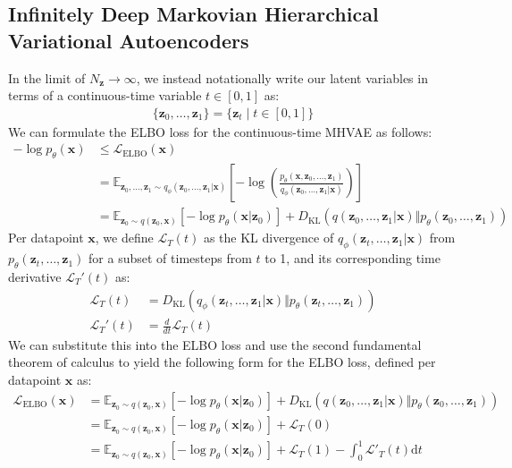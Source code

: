 \documentclass[ oneside,%
                    author={George Herbert},
                    degree={MSci},
                     title={Video Diffusion Models for Climate Simulations},
                  subtitle={}]{dissertation}
\begin{document}
\subsection{Infinitely Deep Markovian Hierarchical Variational Autoencoders}
\label{sec:background_vae_infinite}

In the limit of $N_\mathbf{z}\to\infty$, we instead notationally write our latent variables in terms of a continuous-time variable $t\in[0,1]$ as:
\begin{align}
      \{\mathbf{z}_0,\ldots,\mathbf{z}_1\}=\{\mathbf{z}_t\mid t\in[0,1]\}
\end{align}
We can formulate the ELBO loss for the continuous-time MHVAE as follows:
\begin{align}
      -\log p_\theta(\mathbf{x})&\le \mathcal{L}_{\mathrm{ELBO}}(\mathbf{x})\\
      &=\mathbb{E}_{\mathbf{z}_0,\ldots,\mathbf{z}_1\sim q_\phi(\mathbf{z}_0,\ldots,\mathbf{z}_1|\mathbf{x})}\left[-\log\left(\frac{p_\theta(\mathbf{x},\mathbf{z}_0,\ldots,\mathbf{z}_1)}{q_\phi(\mathbf{z}_0,\ldots,\mathbf{z}_1|\mathbf{x})}\right) \right]\\
      &=\mathbb{E}_{\mathbf{z}_0\sim q(\mathbf{z}_0,\mathbf{x})}\left[-\log p_\theta(\mathbf{x}|\mathbf{z}_0)\right]+D_{\mathrm{KL}}(q(\mathbf{z}_0,\ldots,\mathbf{z}_1|\mathbf{x})\Vert p_\theta (\mathbf{z}_0,\ldots,\mathbf{z}_1))
\end{align}
Per datapoint $\mathbf{x}$, we define $\mathcal{L}_T(t)$ as the KL divergence of $q_\phi(\mathbf{z}_t,\ldots,\mathbf{z}_1|\mathbf{x})$ from $p_\theta(\mathbf{z}_t,\ldots,\mathbf{z}_1)$ for a subset of timesteps from $t$ to 1, and its corresponding time derivative $\mathcal{L}_T'(t)$ as:
\begin{align}
      \mathcal{L}_T(t)&=D_{\mathrm{KL}}(q_\phi(\mathbf{z}_t,\ldots,\mathbf{z}_1|\mathbf{x})\Vert p_\theta(\mathbf{z}_t,\ldots,\mathbf{z}_1))\label{eq:dkl_t}\\
      \mathcal{L}_T'(t)&=\frac{d}{dt}\mathcal{L}_T(t)
\end{align}
We can substitute this into the ELBO loss and use the second fundamental theorem of calculus to yield the following form for the ELBO loss, defined per datapoint $\mathbf{x}$ as:
\begin{align}
      \mathcal{L}_{\mathrm{ELBO}}(\mathbf{x})&=\mathbb{E}_{\mathbf{z}_0\sim q(\mathbf{z}_0,\mathbf{x})}\left[-\log p_\theta(\mathbf{x}|\mathbf{z}_0)\right]+D_{\mathrm{KL}}(q(\mathbf{z}_0,\ldots,\mathbf{z}_1|\mathbf{x})\Vert p_\theta (\mathbf{z}_0,\ldots,\mathbf{z}_1))\\
      &=\mathbb{E}_{\mathbf{z}_0\sim q(\mathbf{z}_0,\mathbf{x})}\left[-\log p_\theta(\mathbf{x}|\mathbf{z}_0)\right]+\mathcal{L}_T(0)\\
      &=\mathbb{E}_{\mathbf{z}_0\sim q(\mathbf{z}_0,\mathbf{x})}\left[-\log p_\theta(\mathbf{x}|\mathbf{z}_0)\right]+\mathcal{L}_T(1)-\int_0^1\mathcal{L}'_T(t)\mathrm{d}t \label{eq:elbo_mhvae}
\end{align}
\end{document}
